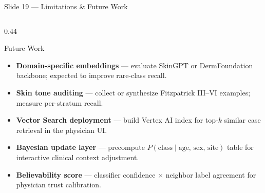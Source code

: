 \documentclass[aspectratio=169, 9pt]{beamer}
\begin{document}
\begin{frame}{Slide 19 --- Limitations \& Future Work}
\begin{columns}[T]
    \begin{column}{0.44\textwidth}
      \begin{block}{Future Work}
        \small
        \begin{itemize}[leftmargin=1em, itemsep=0pt]
          \item \textbf{Domain-specific embeddings} --- evaluate SkinGPT or
                DermFoundation backbone; expected to improve rare-class recall.
          \item \textbf{Skin tone auditing} --- collect or synthesize Fitzpatrick
                III--VI examples; measure per-stratum recall.
          \item \textbf{Vector Search deployment} --- build Vertex AI index for
                top-$k$ similar case retrieval in the physician UI.
          \item \textbf{Bayesian update layer} --- precompute
                $P(\text{class}\mid\text{age, sex, site})$ table for interactive
                clinical context adjustment.
          \item \textbf{Believability score} --- classifier confidence
                $\times$ neighbor label agreement for physician trust calibration.
        \end{itemize}
      \end{block}
    \end{column}

  \end{columns}
\end{frame}

\end{document}
